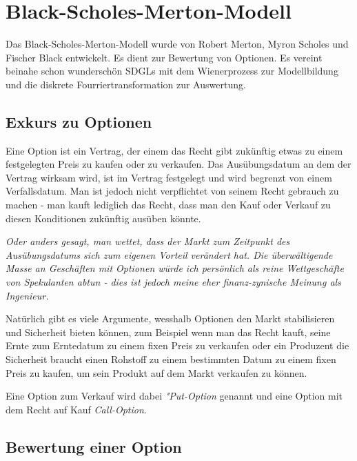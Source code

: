 %
%
%
%

\section{Black-Scholes-Merton-Modell\label{brown:BlackScholes}}

Das Black-Scholes-Merton-Modell wurde von Robert Merton, Myron Scholes und Fischer Black entwickelt. Es dient zur Bewertung von Optionen. Es vereint beinahe schon wunderschön SDGLs mit dem Wienerprozess zur Modellbildung und die diskrete Fourriertransformation zur Auswertung.


\subsection{Exkurs zu Optionen\label{brown:BlackScholes:exkurs}}
Eine Option ist ein Vertrag, der einem das Recht gibt zukünftig etwas zu einem festgelegten Preis zu kaufen oder zu verkaufen. Das Ausübungsdatum an dem der Vertrag wirksam wird, ist im Vertrag festgelegt und wird begrenzt von einem Verfallsdatum. Man ist jedoch nicht verpflichtet von seinem Recht gebrauch zu machen - man kauft lediglich das Recht, dass man den Kauf oder Verkauf zu diesen Konditionen zukünftig ausüben könnte. 

\textit{Oder anders gesagt, man wettet, dass der Markt zum Zeitpunkt des Ausübungsdatums sich zum eigenen Vorteil verändert hat. Die überwältigende Masse an Geschäften mit Optionen würde ich persönlich als reine Wettgeschäfte von Spekulanten abtun - dies ist jedoch meine eher finanz-zynische Meinung als Ingenieur.}

Natürlich gibt es viele Argumente, wesshalb Optionen den Markt stabilisieren und Sicherheit bieten können, zum Beispiel wenn man das Recht kauft, seine Ernte zum Erntedatum zu einem fixen Preis zu verkaufen oder ein Produzent die Sicherheit braucht einen Rohstoff zu einem bestimmten Datum zu einem fixen Preis zu kaufen, um sein Produkt auf dem Markt verkaufen zu können.

Eine Option zum Verkauf wird dabei \textit{"Put-Option} genannt und eine Option mit dem Recht auf Kauf \textit{Call-Option}.

\subsection{Bewertung einer Option\label{brown:BlackScholes:bewertung}}

